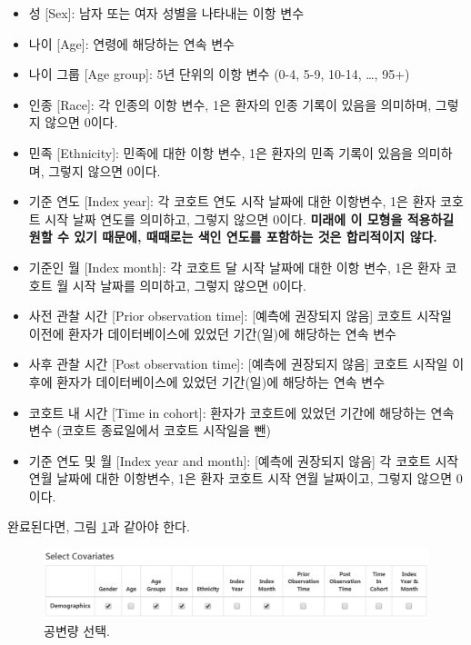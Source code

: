 \documentclass[10.5pt]{book}
\providecommand{\tightlist}{%
  \setlength{\itemsep}{0pt}\setlength{\parskip}{0pt}}
\theoremstyle{definition}
\theoremstyle{definition}
\theoremstyle{definition}
\theoremstyle{remark}
\begin{document}
\begin{itemize}
\tightlist
\item
  성 {[}Sex{]}: 남자 또는 여자 성별을 나타내는 이항 변수
\item
  나이 {[}Age{]}: 연령에 해당하는 연속 변수
\item
  나이 그룹 {[}Age group{]}: 5년 단위의 이항 변수 (0-4, 5-9, 10-14,
  \ldots{}, 95+)
\item
  인종 {[}Race{]}: 각 인종의 이항 변수, 1은 환자의 인종 기록이 있음을
  의미하며, 그렇지 않으면 0이다.
\item
  민족 {[}Ethnicity{]}: 민족에 대한 이항 변수, 1은 환자의 민족 기록이
  있음을 의미하며, 그렇지 않으면 0이다.
\item
  기준 연도 {[}Index year{]}: 각 코호트 연도 시작 날짜에 대한 이항변수,
  1은 환자 코호트 시작 날짜 연도를 의미하고, 그렇지 않으면 0이다.
  \textbf{미래에 이 모형을 적용하길 원할 수 있기 때문에, 때때로는 색인
  연도를 포함하는 것은 합리적이지 않다.}
\item
  기준인 월 {[}Index month{]}: 각 코호트 달 시작 날짜에 대한 이항 변수,
  1은 환자 코호트 월 시작 날짜를 의미하고, 그렇지 않으면 0이다.
\item
  사전 관찰 시간 {[}Prior observation time{]}: {[}예측에 권장되지
  않음{]} 코호트 시작일 이전에 환자가 데이터베이스에 있었던 기간(일)에
  해당하는 연속 변수
\item
  사후 관찰 시간 {[}Post observation time{]}: {[}예측에 권장되지 않음{]}
  코호트 시작일 이후에 환자가 데이터베이스에 있었던 기간(일)에 해당하는
  연속 변수
\item
  코호트 내 시간 {[}Time in cohort{]}: 환자가 코호트에 있었던 기간에
  해당하는 연속 변수 (코호트 종료일에서 코호트 시작일을 뺀)
\item
  기준 연도 및 월 {[}Index year and month{]}: {[}예측에 권장되지 않음{]}
  각 코호트 시작 연월 날짜에 대한 이항변수, 1은 환자 코호트 시작 연월
  날짜이고, 그렇지 않으면 0이다.
\end{itemize}

완료된다면, 그림 \ref{fig:covariateSettings2}과 같아야 한다.

\begin{figure}

{\centering \includegraphics[width=1\linewidth]{images/PatientLevelPrediction/covariateSettings2} 

}

\caption{공변량 선택.}\label{fig:covariateSettings2}
\end{figure}
\end{document}
